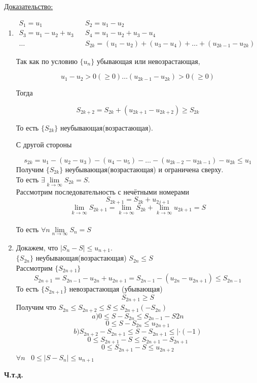 \documentclass[12pt]{article}
\let\oldlim\lim
\renewcommand{\lim}{\oldlim\limits}
\begin{document}
  \underline{Доказательство:}
  \begin{adjustwidth}{1.5em}{1.5em}
    \begin{enumerate}
      \item
      $\begin{matrix}
        S_1=u_1 && S_2=u_1-u_2\\
        S_3=u_1-u_2+u_3 && S_4 = u_1-u_2+u_3-u_4 \\
        \dots && S_{2k} = (u_1-u_2)+(u_3-u_4)+\dots + (u_{2k-1}-u_{2k})
      \end{matrix}$\\

      \begin{center}
              Так как по условию $\{u_n\}$ убывающая или невозрастающая,
      \end{center}
      \[u_1-u_2 > 0 (\geq 0)\dots  (u_{2k-1}-u_{2k}) > 0 (\geq 0)\] 
      \begin{center}
        Тогда
      \end{center}
      \[S_{2k+2}=S_{2k}+(u_{2k+1}-u_{2k+2})\geq S_{2k}\]
      \begin{center}
        То есть $\{S_{2k}\}$ неубывающая(возрастающая).
      \end{center}
      \begin{center}
        С другой стороны
      \end{center} 
      \[s_{2k}=u_1-(u_2-u_3)-(u_4-u_5)-\dots-(u_{2k-2}-u_{2k-1})-u_{2k}\leq u_1\]
      Получим $\{S_{2k}\}$ неубывающая(возрастающая) и ограничена сверху. \\
      То есть 
      $\exists \lim_{k \to \infty}S_{2k}=S$.\\



      Рассмотрим последовательность с нечётными номерами
      \[S_{2k+1}=S_{2k}+u_{2j+1}\]
      \[\lim_{k \to \infty} S_{2k+1}=\lim_{k \to \infty} S_{2k}+\lim_{k \to \infty} u_{2k+1} = S\]\\
      То есть $\forall n \lim_{n \to \infty} S_n =S$


      \item Докажем, что $|S_n-S|\leq u_{n+1}$.\\
      $\{S_{2n}\}$ неубывающая(возрастающая) $S_{2n}\leq S$\\
      Рассмотрим $\{S_{2n+1}\}$ 
      \[S_{2n+1}=S_{2n-1}-u_{2n}+u_{2n+1}=S_{2n-1}-(u_{2n}-u_{2n+1})\leq S_{2n-1}\]
      То есть $\{S_{2n+1}\}$ невозрастающая (убывающая)
      \[S_{2n+1}\geq S\]
      Получим что $S_{2n}\leq S_{2n+2}\leq S\leq S_{2n+1}(-S_{2n})$
      \[a) 0\leq S-S_{2n}\leq S_{2n-1}-S{2n}\]
      \[0\leq S-S_{2n}\leq u_{2n+1}\]
      \[b) S_{2n+2}-S_{2n+1}\leq S-S_{2n+1}\leq | \cdot (-1)\]
      \[0\leq S_{2n+1}-S \leq S_{2n+1} - S_{2n+1}\]
      \[0\leq S_{2n+1}-S \leq u_{2n+2}\]
      $\forall n \hspace{10pt} 0\leq |S-S_n|\leq u_{n+1}$ 
    \end{enumerate}
  \end{adjustwidth}
  \begin{center}
    \textbf{Ч.т.д.}
  \end{center}
\end{document}
